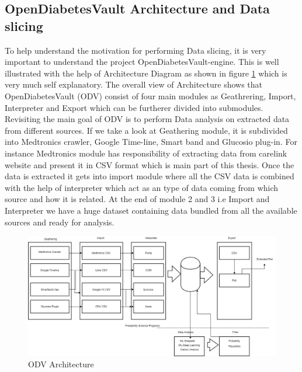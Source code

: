 \documentclass[article,type=msc,colorback,accentcolor=tud9c,twoside,11pt]{tudthesis}
\begin{document}
\subsection{OpenDiabetesVault Architecture and Data slicing}
\label{subsec:OpenDiabetesVaultArchitecture}
To help understand the motivation for performing Data slicing, it is very important to understand the project OpenDiabetesVault-engine. This is well illustrated with the help of Architecture Diagram as shown in figure \ref{fig:ODVArchitecture} which is very much self explanatory. The overall view of Architecture shows that OpenDiabetesVault (ODV) consist of four main modules as Geathrering, Import, Interpreter and Export which can be furtherer divided into submodules. Revisiting the main goal of ODV is to perform Data analysis on extracted data from different sources. If we take a look at Geathering module, it is subdivided into Medtronics crawler, Google Time-line, Smart band and Glucosio plug-in. For instance Medtronics module has responsibility of extracting data from carelink website and present it in CSV format which is main part of this thesis. Once the data is extracted it gets into import module where all the CSV data is combined with the help of interpreter which act as an type of data coming from which source and how it is related. At the end of module 2 and 3 i.e Import and Interpreter we have a huge dataset containing data bundled from all the available sources and ready for analysis.
\begin{figure}[h]
	\centering
	\includegraphics[scale=0.4]{ODVArchitecture.jpg}
	\caption{ODV Architecture}
	\label{fig:ODVArchitecture}
\end{figure}
\end{document}
